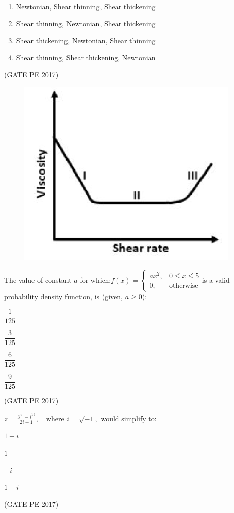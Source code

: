 \documentclass[journal,12pt,onecolumn]{IEEEtran}
\theoremstyle{remark}
\begin{document}
\begin{enumerate}
{\begin{enumerate}
\item Newtonian, Shear thinning, Shear thickening
\item Shear thinning, Newtonian, Shear thickening
\item Shear thickening, Newtonian, Shear thinning
\item Shear thinning, Shear thickening, Newtonian
\end{enumerate}
\hfill{(GATE PE 2017)}
\begin{figure}[h]
    \centering
    \includegraphics[width=0.5\columnwidth]{Graph_Q41.png}
    \caption{}
    \label{fig:placeholder}
\end{figure}
\item The value of constant $a$ for which:$ f(x) = \begin{cases}ax^2, & 0 \leq x \leq 5 \\0, & \text{otherwise}
\end{cases}$is a valid probability density function, is (given, $a \geq 0$):
\begin{enumerate}
\begin{multicols}{4}
\item $\dfrac{1}{125}$
\item $\dfrac{3}{125}$
\item $\dfrac{6}{125}$
\item $\dfrac{9}{125}$
\end{multicols}
\end{enumerate}
\hfill{(GATE PE 2017)}

\item $z = \frac{3^{30} - i^{19}}{2i - 1}, \quad \text{where } i = \sqrt{-1},$ would simplify to:
\begin{enumerate}
\begin{multicols}{4}
\item $1 - i$
\item $1$
\item $-i$
\item $1 + i$
\end{multicols}
\end{enumerate}
\hfill{(GATE PE 2017)}

}
\end{enumerate}
\end{document}

